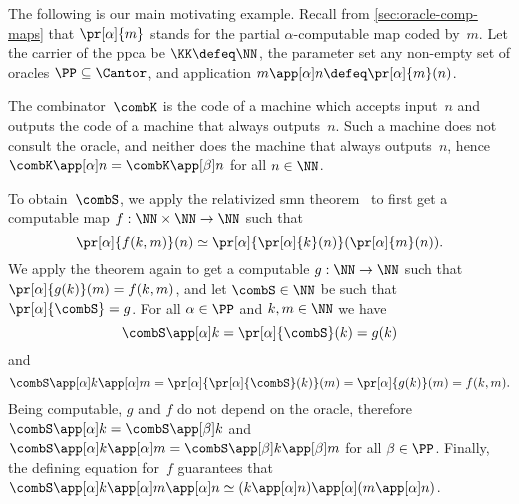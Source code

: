 \begin{example}
  \label{ex:oracle-ppca}
  The following is our main motivating example.
  Recall from \cref{sec:oracle-comp-maps} that $\pr[\alpha]{m}$ stands for the partial $\alpha$-computable map coded by~$m$.
  Let the carrier of the ppca be $\KK \defeq \NN$,
  the parameter set any non-empty set of oracles $\PP \subseteq \Cantor$,
  and application $m \app[\alpha] n \defeq \pr[\alpha]{m}(n)$.

  The combinator~$\combK$ is the code of a machine which accepts input~$n$ and outputs the code of a machine that always outputs~$n$. Such a machine does not consult the oracle, and neither does the machine that always outputs~$n$, hence $\combK \app[\alpha] n = \combK \app[\beta] n$ for all $n \in \NN$.

  To obtain~$\combS$, we apply the relativized smn theorem~\cite[Sect.~III.1.5]{soare87:_recur_enumer_sets_degrees} to first get a computable map $f : \NN \times \NN \to \NN$ such that
  \begin{equation*}
    \pr[\alpha]{f(k, m)}(n) \simeq \pr[\alpha]{\pr[\alpha]{k}(n)}(\pr[\alpha]{m}(n)).
  \end{equation*}
  We apply the theorem again to get a computable $g : \NN \to \NN$ such that
  $\pr[\alpha]{g(k)}(m) = f(k, m)$, and let $\combS \in \NN$ be such that $\pr[\alpha]{\combS} = g$.
  For all $\alpha \in \PP$ and $k, m \in \NN$ we have
  \begin{equation*}
    \combS \app[\alpha] k =
    \pr[\alpha]{\combS}(k) =
    g(k)
  \end{equation*}
  and
  \begin{equation*}
    \combS \app[\alpha] k \app[\alpha] m =
    \pr[\alpha]{\pr[\alpha]{\combS}(k)}(m) =
    \pr[\alpha]{g(k)}(m) =
    f(k, m).
  \end{equation*}
  Being computable, $g$ and $f$ do not depend on the oracle, therefore
  $\combS \app[\alpha] k = \combS \app[\beta] k$
  and
  $\combS \app[\alpha] k \app[\alpha] m = \combS \app[\beta] k \app[\beta] m$ for all $\beta \in \PP$.
  Finally, the defining equation for~$f$ guarantees that
  $\combS \app[\alpha] k \app[\alpha] m \app[\alpha] n \simeq
   (k \app[\alpha] n) \app[\alpha] (m \app[\alpha] n)$.
\end{example}


